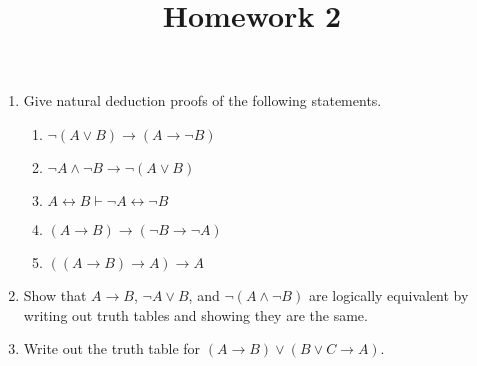 \documentclass[12pt]{amsart}
\theoremstyle{definition}
\begin{document}
\title{Homework 2}

\maketitle

\begin{enumerate}
	\item Give natural deduction proofs of the following statements. 

	\begin{enumerate}

	\item $\neg(A \lor B) \to (A \to \neg B)$ 
	\item $\neg A \land \neg B \to \neg (A \lor B)$
	\item $A \leftrightarrow B \vdash \neg A \leftrightarrow \neg B$
	\item $(A \to B) \to (\neg B \to \neg A)$
	\item $((A \to B) \to A) \to A$
	
	\end{enumerate}

	\item Show that $A \to B$, $\neg A \lor B$, and $\neg (A \land \neg B)$ are logically 
		equivalent by writing out truth tables and showing they are the same.

	\item Write out the truth table for $(A \to B) \lor (B \lor C \to A)$. 

\end{enumerate}
\end{document}
